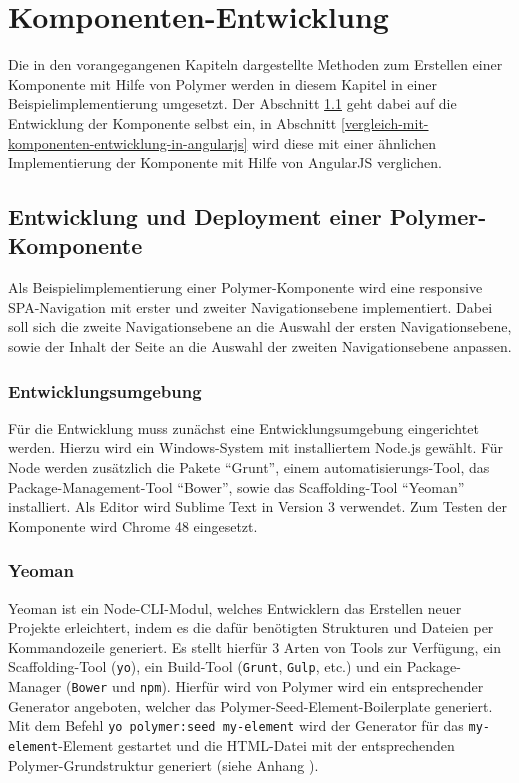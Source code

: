 \chapter{Komponenten-Entwicklung}\label{komponenten-entwicklung}

Die in den vorangegangenen Kapiteln dargestellte Methoden zum Erstellen einer Komponente mit Hilfe von Polymer werden in diesem Kapitel in einer Beispielimplementierung umgesetzt. Der Abschnitt \ref{entwicklung-und-deployment-einer-polymer-komponente} geht dabei auf die Entwicklung der Komponente selbst ein, in Abschnitt \ref{vergleich-mit-komponenten-entwicklung-in-angularjs} wird diese mit einer ähnlichen Implementierung der Komponente mit Hilfe von AngularJS verglichen.


\section{Entwicklung und Deployment einer Polymer-Komponente}\label{entwicklung-und-deployment-einer-polymer-komponente}

Als Beispielimplementierung einer Polymer-Komponente wird eine responsive \ac{SPA}-Navigation mit erster und zweiter Navigationsebene implementiert. Dabei soll sich die zweite Navigationsebene an die Auswahl der ersten Navigationsebene, sowie der Inhalt der Seite an die Auswahl der zweiten Navigationsebene anpassen.


\subsection{Entwicklungsumgebung}\label{entwicklungsumgebung}

Für die Entwicklung muss zunächst eine Entwicklungsumgebung eingerichtet werden. Hierzu wird ein Windows-System mit installiertem Node.js gewählt. Für Node werden zusätzlich die Pakete ``Grunt'', einem automatisierungs-Tool, das Package-Management-Tool ``Bower'', sowie das Scaffolding-Tool ``Yeoman'' installiert. Als Editor wird Sublime Text in Version 3 verwendet. Zum Testen der Komponente wird Chrome 48 eingesetzt.


\subsection{Yeoman}\label{yeoman}

Yeoman \cite{citeulike:13916358} ist ein Node-\ac{CLI}-Modul, welches Entwicklern das Erstellen neuer Projekte erleichtert, indem es die dafür benötigten Strukturen und Dateien per Kommandozeile generiert. Es stellt hierfür 3 Arten von Tools zur Verfügung, ein Scaffolding-Tool (\texttt{yo}), ein Build-Tool (\texttt{Grunt}, \texttt{Gulp}, etc.) und ein Package-Manager (\texttt{Bower} und \texttt{npm}). Hierfür wird von Polymer wird ein entsprechender Generator angeboten, welcher das Polymer-Seed-Element-Boilerplate generiert. Mit dem Befehl \texttt{yo\ polymer:seed\ my-element} wird der Generator für das \texttt{my-element}-Element gestartet und die \ac{HTML}-Datei mit der entsprechenden Polymer-Grundstruktur generiert (siehe Anhang ).


